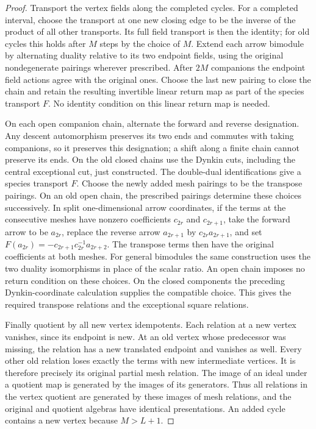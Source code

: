 \begin{proof}
Transport the vertex fields along the completed cycles. For a completed interval, choose the transport at one new closing edge to be the inverse of the product of all other transports. Its full field transport is then the identity; for old cycles this holds after $M$ steps by the choice of $M$. Extend each arrow bimodule by alternating duality relative to its two endpoint fields, using the original nondegenerate pairings wherever prescribed. After $2M$ companions the endpoint field actions agree with the original ones. Choose the last new pairing to close the chain and retain the resulting invertible linear return map as part of the species transport $F$. No identity condition on this linear return map is needed.

On each open companion chain, alternate the forward and reverse designation. Any descent automorphism preserves its two ends and commutes with taking companions, so it preserves this designation; a shift along a finite chain cannot preserve its ends. On the old closed chains use the Dynkin cuts, including the central exceptional cut, just constructed. The double-dual identifications give a species transport $F$. Choose the newly added mesh pairings to be the transpose pairings. On an old open chain, the prescribed pairings determine these choices successively. In split one-dimensional arrow coordinates, if the terms at the consecutive meshes have nonzero coefficients $c_{2r}$ and $c_{2r+1}$, take the forward arrow to be $a_{2r}$, replace the reverse arrow $a_{2r+1}$ by $c_{2r}a_{2r+1}$, and set $F(a_{2r})=-c_{2r+1}c_{2r}^{-1}a_{2r+2}$. The transpose terms then have the original coefficients at both meshes. For general bimodules the same construction uses the two duality isomorphisms in place of the scalar ratio. An open chain imposes no return condition on these choices. On the closed components the preceding Dynkin-coordinate calculation supplies the compatible choice. This gives the required transpose relations and the exceptional square relations.

Finally quotient by all new vertex idempotents. Each relation at a new vertex vanishes, since its endpoint is new. At an old vertex whose predecessor was missing, the relation has a new translated endpoint and vanishes as well. Every other old relation loses exactly the terms with new intermediate vertices. It is therefore precisely its original partial mesh relation. The image of an ideal under a quotient map is generated by the images of its generators. Thus all relations in the vertex quotient are generated by these images of mesh relations, and the original and quotient algebras have identical presentations. An added cycle contains a new vertex because $M>L+1$.
\end{proof}

